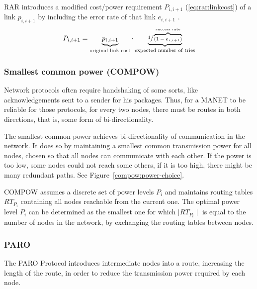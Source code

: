 RAR\cite{banerjee2002minimum} introduces a modified cost/power requirement
$P_{i,i+1}$ (\ref{eq:rar:linkcost}) of a link $p_{i,i+1}$ by including the error
rate of that link $e_{i,i+1}$ .
\begin{align}\label{eq:rar:linkcost}
  P_{i,i+1} = \underbrace{p_{i,i+1}}_{\text{original link cost}} \cdot \underbrace{\sfrac{1}{\overbrace{(1-e_{i,i+1})}^{\text{success rate}}}}_{\text{expected number of tries}}
\end{align} 

\subsubsection{Smallest common power (COMPOW)}
Network protocols often require handshaking of some sorts, like acknowledgements
sent to a sender for his packages. Thus, for a MANET to be reliable for those
protocols, for every two nodes, there must be routes in both directions, that
is, some form of bi-directionality.

The smallest common power\cite{narayanaswamy2002power} achieves bi-directionality
of communication in the network.
It does so by maintaining a smallest common transmission power for all nodes,
chosen so that all nodes can communicate with each other. If the power is too
low, some nodes could not reach some others, if it is too high, there might be
many redundant paths. See Figure~\ref{compow:power-choice}.

COMPOW assumes a discrete set of power levels $P_{i}$ and maintains routing
tables ${RT}_{P_{i}}$ containing all nodes reachable from the current one. The
optimal power level $P_{i}$ can be determined as the smallest one for which
$\mid RT_{P_{i}} \mid$ is equal to the number of nodes in the network, by
exchanging the routing tables between nodes.

\subsubsection{PARO}
The PARO Protocol\cite{gomez2003paro} introduces intermediate nodes into a
route, increasing the length of the route, in order to reduce the transmission
power required by each node.

